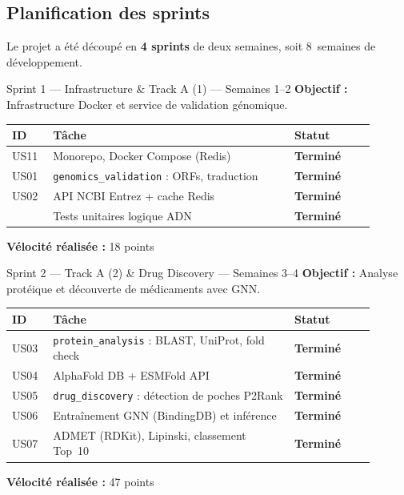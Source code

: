 \documentclass[12pt,a4paper,oneside]{book}
\begin{document}
\subsection{Planification des sprints}

Le projet a été découpé en \textbf{4 sprints} de deux semaines, soit
8~semaines de développement.

\begin{sprintbox}{Sprint 1 — Infrastructure \& Track A (1) — Semaines 1--2}
\textbf{Objectif :} Infrastructure Docker et service de validation génomique.

\medskip
\begin{tabular}{L{0.10\linewidth} L{0.60\linewidth} L{0.20\linewidth}}
\textbf{ID} & \textbf{Tâche} & \textbf{Statut} \\
\hline
US11 & Monorepo, Docker Compose (Redis) & \textcolor{green!60!black}{\textbf{Terminé}} \\
US01 & \texttt{genomics\_validation} : ORFs, traduction & \textcolor{green!60!black}{\textbf{Terminé}} \\
US02 & API NCBI Entrez + cache Redis & \textcolor{green!60!black}{\textbf{Terminé}} \\
     & Tests unitaires logique ADN & \textcolor{green!60!black}{\textbf{Terminé}} \\
\end{tabular}

\medskip\textbf{Vélocité réalisée :} 18 points
\end{sprintbox}

\vspace{0.8em}

\begin{sprintbox}{Sprint 2 — Track A (2) \& Drug Discovery — Semaines 3--4}
\textbf{Objectif :} Analyse protéique et découverte de médicaments avec GNN.

\medskip
\begin{tabular}{L{0.10\linewidth} L{0.60\linewidth} L{0.20\linewidth}}
\textbf{ID} & \textbf{Tâche} & \textbf{Statut} \\
\hline
US03 & \texttt{protein\_analysis} : BLAST, UniProt, fold check & \textcolor{green!60!black}{\textbf{Terminé}} \\
US04 & AlphaFold DB + ESMFold API & \textcolor{green!60!black}{\textbf{Terminé}} \\
US05 & \texttt{drug\_discovery} : détection de poches P2Rank & \textcolor{green!60!black}{\textbf{Terminé}} \\
US06 & Entraînement GNN (BindingDB) et inférence & \textcolor{green!60!black}{\textbf{Terminé}} \\
US07 & ADMET (RDKit), Lipinski, classement Top~10 & \textcolor{green!60!black}{\textbf{Terminé}} \\
\end{tabular}

\medskip\textbf{Vélocité réalisée :} 47 points
\end{sprintbox}
\end{document}
